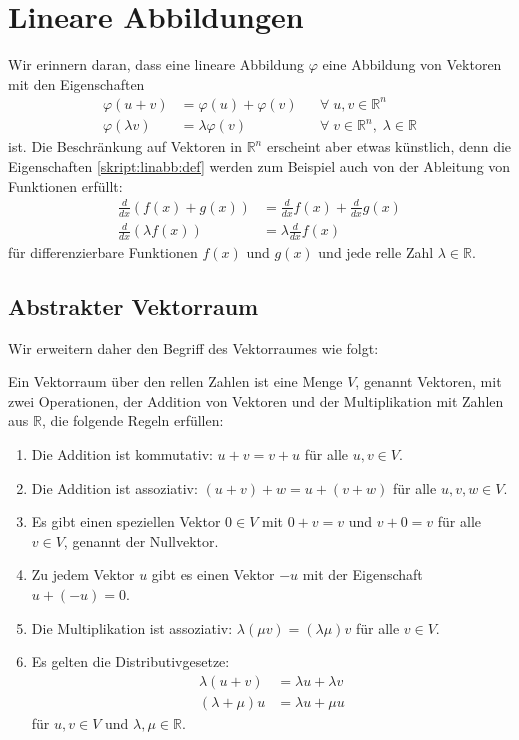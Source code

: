 %
%
%
\section{Lineare Abbildungen}
Wir erinnern daran, dass eine lineare Abbildung $\varphi$ eine
Abbildung von Vektoren mit den Eigenschaften
\begin{equation}
\begin{aligned}
\varphi(u+v)&=\varphi(u)+\varphi(v)   &&\forall\;u,v\in\mathbb R^n
\\
\varphi(\lambda v)&=\lambda\varphi(v) &&\forall\;v\in\mathbb R^n,\;\lambda\in\mathbb R
\end{aligned}
\label{skript:linabb:def}
\end{equation}
ist.
Die Beschränkung auf Vektoren in $\mathbb R^n$ erscheint aber etwas
künstlich, denn die Eigenschaften
\eqref{skript:linabb:def}
werden zum Beispiel auch von der Ableitung von Funktionen erfüllt:
\begin{equation}
\begin{aligned}
\frac{d}{dx} ( f(x) + g(x)) &= \frac{d}{dx}f(x) + \frac{d}{dx}g(x)
\\
\frac{d}{dx}(\lambda f(x)) &= \lambda\frac{d}{dx}f(x)
\end{aligned}
\label{skript:linabb:abl}
\end{equation}
für differenzierbare Funktionen $f(x)$ und $g(x)$ und jede relle Zahl
$\lambda\in\mathbb R$.

%
%
\subsection{Abstrakter Vektorraum}
Wir erweitern daher den Begriff des Vektorraumes wie folgt:

\begin{definition}
Ein Vektorraum über den rellen Zahlen ist eine Menge $V$, genannt
Vektoren, mit zwei Operationen,
der Addition von Vektoren und der Multiplikation mit Zahlen aus $\mathbb R$,
die folgende Regeln erfüllen:
\begin{enumerate}
\item Die Addition ist kommutativ: $u+v=v+u$ für alle $u,v\in V$.
\item Die Addition ist assoziativ: $(u+v)+w=u+(v+w)$ für alle $u,v,w\in V$.
\item Es gibt einen speziellen Vektor $0\in V$ mit $0+v=v$ und $v+0=v$
für alle $v\in V$, genannt der Nullvektor.
\item Zu jedem Vektor $u$ gibt es einen Vektor $-u$ mit der Eigenschaft
$u+(-u)=0$.
\item Die Multiplikation ist assoziativ: $\lambda(\mu v) = (\lambda\mu)v$
für alle $v\in V$.
\item Es gelten die Distributivgesetze:
\begin{align*}
\lambda(u+v) &= \lambda u + \lambda v
\\
(\lambda + \mu)u&=\lambda u + \mu u
\end{align*}
für $u,v\in V$ und $\lambda,\mu\in\mathbb R$.
\end{enumerate}
\end{definition}

